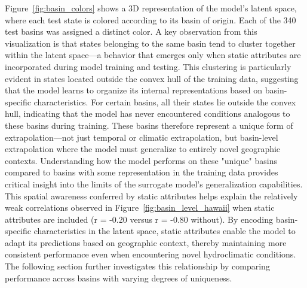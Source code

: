 \documentclass{article}
\begin{document}
Figure~\ref{fig:basin_colors} shows a 3D representation of the model's latent space, where each test state is colored according to its basin of origin. Each of the 340 test basins was assigned a distinct color. A key observation from this visualization is that states belonging to the same basin tend to cluster together within the latent space—a behavior that emerges only when static attributes are incorporated during model training and testing. This clustering is particularly evident in states located outside the convex hull of the training data, suggesting that the model learns to organize its internal representations based on basin-specific characteristics. For certain basins, all their states lie outside the convex hull, indicating that the model has never encountered conditions analogous to these basins during training. These basins therefore represent a unique form of extrapolation—not just temporal or climatic extrapolation, but basin-level extrapolation where the model must generalize to entirely novel geographic contexts. Understanding how the model performs on these "unique" basins compared to basins with some representation in the training data provides critical insight into the limits of the surrogate model's generalization capabilities. This spatial awareness conferred by static attributes helps explain the relatively weak correlations observed in Figure~\ref{fig:basin_level_hawaii} when static attributes are included (r = -0.20 versus r = -0.80 without). By encoding basin-specific characteristics in the latent space, static attributes enable the model to adapt its predictions based on geographic context, thereby maintaining more consistent performance even when encountering novel hydroclimatic conditions. The following section further investigates this relationship by comparing performance across basins with varying degrees of uniqueness.
\end{document}

